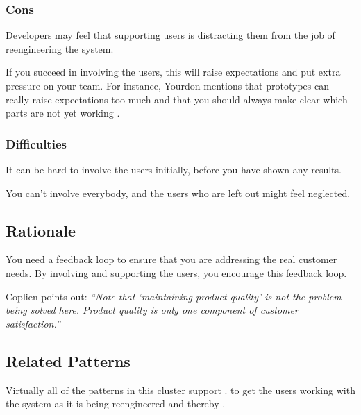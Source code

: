 \documentclass[a4paper,10pt,twoside]{book}
\begin{document}
\subsubsection*{Cons}

\begin{bulletlist}
\item Developers may feel that supporting users is distracting them from the job of reengineering the system.

\item If you succeed in involving the users, this will raise expectations and put extra pressure on your team. For instance, Yourdon mentions that prototypes can really raise expectations too much and that you should always make clear which parts are not yet working \cite{Your97a}.
\end{bulletlist}

\subsubsection*{Difficulties}

\begin{bulletlist}
\item It can be hard to involve the users initially, before you have shown any results.

\item You can't involve everybody, and the users who are left out might feel neglected.
\end{bulletlist}

\subsection*{Rationale}

You need a feedback loop to ensure that you are addressing the real customer needs. By involving and supporting the users, you encourage this feedback loop.

Coplien points out: \emph{``Note that `maintaining product quality' is not the problem being solved here. Product quality is only one component of customer satisfaction.''} \cite{Copl95d}

\subsection*{Related Patterns}

Virtually all of the patterns in this cluster support .  to get the users working with the system as it is being reengineered and thereby .
\end{document}
